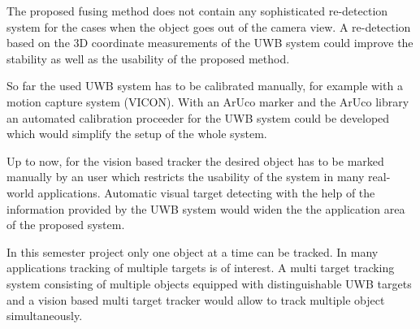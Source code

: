 The proposed fusing method does not contain any sophisticated re-detection system for the cases when the object goes out of the camera view. A re-detection based on the 3D coordinate measurements of the \ac{UWB} system could improve the stability as well as the usability of the proposed method.

So far the used \ac{UWB} system has to be calibrated manually, for example with a motion capture system (VICON). With an ArUco marker and the ArUco library \cite{Aruco2014} an automated calibration proceeder for the \ac{UWB} system could be developed which would simplify the setup of the whole system. 

Up to now, for the vision based tracker the desired object has to be marked manually by an user which restricts the usability of the system in many real-world applications. Automatic visual target detecting with the help of the information provided by the \ac{UWB} system would widen the the application area of the proposed system.

In this semester project only one object at a time can be tracked. In many applications tracking of multiple targets is of interest. A multi target tracking system consisting of multiple objects equipped with distinguishable \ac{UWB} targets and a vision based multi target tracker would allow to track multiple object simultaneously. 